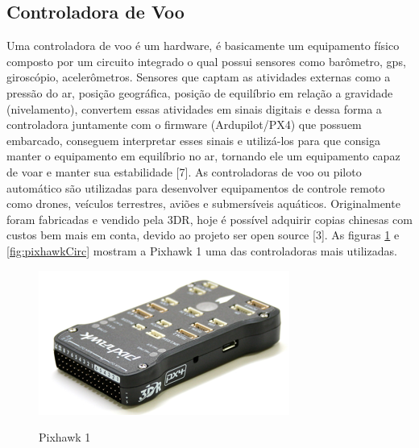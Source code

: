 \subsection{Controladora de Voo}
Uma controladora de voo é um hardware, é basicamente um equipamento físico composto por um circuito integrado o qual possui sensores como barômetro, gps, giroscópio, acelerômetros. Sensores que captam as atividades externas como a pressão do ar, posição geográfica, posição de equilíbrio em relação a gravidade (nivelamento), convertem essas atividades em sinais digitais e dessa forma a controladora juntamente com o firmware (Ardupilot/PX4) que possuem embarcado, conseguem interpretar esses sinais e utilizá-los para que consiga manter o equipamento em equilíbrio no ar, tornando ele um equipamento capaz de voar   e manter sua estabilidade [7].     
As controladoras de voo ou piloto automático são utilizadas para desenvolver equipamentos de controle remoto como drones, veículos terrestres, aviões e submersíveis aquáticos. Originalmente foram fabricadas e vendido pela 3DR, hoje é possível adquirir copias chinesas com custos bem mais em conta, devido ao projeto ser open source [3].
As figuras \ref{fig:pixhawk} e \ref{fig:pixhawkCirc} mostram a Pixhawk 1 uma das controladoras mais utilizadas.

\begin{figure}[htpb]
  \centering
  \caption{Pixhawk 1}
  \includegraphics[scale=.7]{figs/pixhawk.png}
  \label{fig:pixhawk}
\end{figure}

